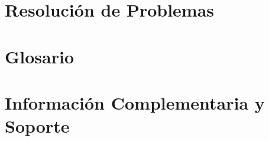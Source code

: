 \documentclass[11pt, a4paper, twoside]{report}
\begin{document}
\chapter{Resolución de Problemas}

\chapter*{Glosario}

\appendix
\chapter{Información Complementaria y Soporte}
\end{document}
